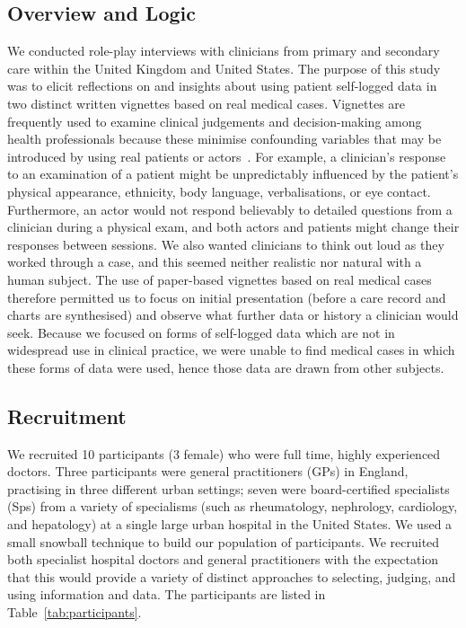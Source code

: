 \documentclass{sigchi}
\begin{document}
\subsection{Overview and Logic}
We conducted role-play interviews with clinicians from primary and secondary care within the United Kingdom and United States. The purpose of this study was to elicit reflections on and insights about using patient self-logged data in two distinct written vignettes based on real medical cases.  Vignettes are frequently used to examine clinical judgements and decision-making among health professionals because these minimise confounding variables that may be introduced by using real patients or actors~\cite{evans2015vignette,redelmeier1995probability}. For example, a clinician's response to an examination of a patient might be unpredictably influenced by the patient's physical appearance, ethnicity, body language, verbalisations, or eye contact. Furthermore, an actor would not respond believably to detailed questions from a clinician during a physical exam, and both actors and patients might change their responses between sessions. We also wanted clinicians to think out loud as they worked through a case, and this seemed neither realistic nor natural with a human subject.  The use of paper-based vignettes based on real medical cases therefore permitted us to focus on initial presentation (before a care record and charts are synthesised) and observe what further data or history a clinician would seek. Because we focused on forms of self-logged data which are not in widespread use in clinical practice, we were unable to find medical cases in which these forms of data were used, hence those data are drawn from other subjects. 


\subsection{Recruitment}
We recruited 10 participants (3 female) who were full time, highly experienced doctors.  Three participants were general practitioners (GPs) in England, practising in three different urban settings; seven were board-certified specialists (Sps) from a variety of specialisms (such as rheumatology, nephrology, cardiology, and hepatology) at a single large urban hospital in the United States.  We used a small snowball technique to build our population of participants.   We recruited both specialist hospital doctors and general practitioners with the expectation that this would provide a variety of distinct approaches to selecting, judging, and using information and data.  The participants are listed in Table~\ref{tab:participants}.
\end{document}
